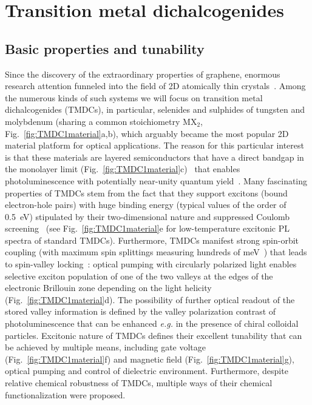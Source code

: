 \documentclass[journal=chreay,manuscript=review]{achemso}
\begin{document}
\section{Transition metal dichalcogenides}

\subsection{Basic properties and tunability}

Since the discovery of the extraordinary properties of graphene, enormous research attention funneled into the field of 2D atomically thin crystals~\cite{dai2020artificial}. Among the numerous kinds of such systems we will focus on transition metal dichalcogenides (TMDCs), in particular, selenides and sulphides of tungsten and molybdenum (sharing a common stoichiometry MX$_2$, Fig.~\ref{fig:TMDC1material}a,b), which arguably became the most popular 2D material platform for optical applications. The reason for this particular interest is that these materials are layered semiconductors that have a direct bandgap in the monolayer limit (Fig.~\ref{fig:TMDC1material}c)~\cite{splendiani2010emerging, mak2016photonics} that enables photoluminescence with potentially near-unity quantum yield~\cite{amani2015near, lien2019electrical}. Many fascinating properties of TMDCs stem from the fact that they support excitons (bound electron-hole pairs) with huge binding energy (typical values of the order of 0.5~eV) stipulated by their two-dimensional nature and suppressed Coulomb screening~\cite{wang2018colloquium} (see Fig.~\ref{fig:TMDC1material}e for low-temperature excitonic PL spectra of standard TMDCs). Furthermore, TMDCs manifest strong spin-orbit coupling (with maximum spin splittings measuring hundreds of meV~\cite{zhu2011giant}) that leads to spin-valley locking~\cite{xu2014spin}: optical pumping with circularly polarized light enables selective exciton population of one of the two valleys at the edges of the electronic Brillouin zone depending on the light helicity (Fig.~\ref{fig:TMDC1material}d). The possibility of further optical readout of the stored valley information is defined by the valley polarization contrast of photoluminescence that can be enhanced \textit{e.g.} in the presence of chiral colloidal particles.\cite{kim2020single}  Excitonic nature of TMDCs defines their excellent tunability that can be achieved by multiple means, including gate voltage\cite{ross2013electrical,van2020exciton} (Fig.~\ref{fig:TMDC1material}f) and magnetic field\cite{li2014valley} (Fig.~\ref{fig:TMDC1material}g), optical pumping\cite{barachati2018interacting,kravtsov2020nonlinear} and control of dielectric environment\cite{raja2017coulomb}. Furthermore, despite relative chemical robustness of TMDCs, multiple ways of their chemical functionalization were proposed\cite{chen2016functionalization}.
\end{document}
